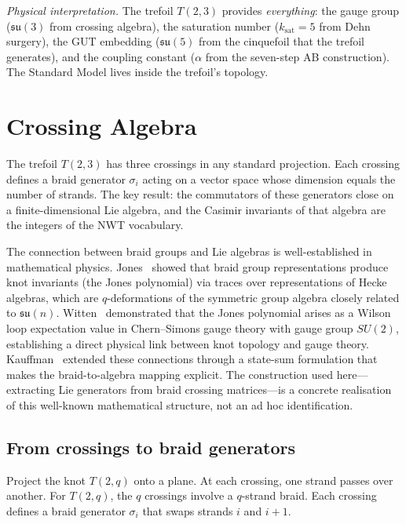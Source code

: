 \documentclass[11pt]{article}
\newcommand{\su}{\mathfrak{su}}
\begin{document}
\emph{Physical interpretation.}  The trefoil $T(2,3)$ provides
\emph{everything}: the gauge group ($\su(3)$ from crossing
algebra), the saturation number ($k_\text{sat} = 5$ from Dehn
surgery), the GUT embedding ($\su(5)$ from the cinquefoil that
the trefoil generates), and the coupling constant ($\alpha$ from
the seven-step AB construction).  The Standard Model lives inside
the trefoil's topology.


\section{Crossing Algebra}
\label{sec:crossing-algebra}

The trefoil $T(2,3)$ has three crossings in any standard
projection.  Each crossing defines a braid generator $\sigma_i$
acting on a vector space whose dimension equals the number of
strands.  The key result: the commutators of these generators
close on a finite-dimensional Lie algebra, and the Casimir
invariants of that algebra are the integers of the NWT vocabulary.

The connection between braid groups and Lie algebras is
well-established in mathematical physics.
Jones~\cite{Jones1985} showed that braid group representations
produce knot invariants (the Jones polynomial) via traces over
representations of Hecke algebras, which are $q$-deformations of
the symmetric group algebra closely related to $\su(n)$.
Witten~\cite{Witten1989} demonstrated that the Jones polynomial
arises as a Wilson loop expectation value in Chern--Simons gauge
theory with gauge group $SU(2)$, establishing a direct physical
link between knot topology and gauge theory.
Kauffman~\cite{Kauffman1991} extended these connections through
a state-sum formulation that makes the braid-to-algebra mapping
explicit.  The construction used here---extracting Lie generators
from braid crossing matrices---is a concrete realisation of this
well-known mathematical structure, not an ad hoc identification.

\subsection{From crossings to braid generators}

Project the knot $T(2,q)$ onto a plane.  At each crossing, one
strand passes over another.  For $T(2,q)$, the $q$ crossings
involve a $q$-strand braid.  Each crossing defines a braid
generator $\sigma_i$ that swaps strands $i$ and $i{+}1$.
\end{document}

